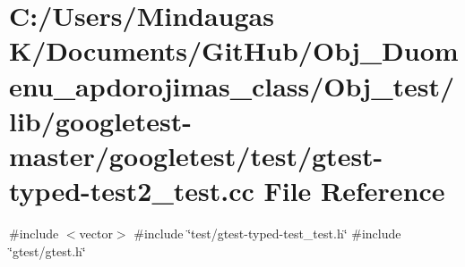 \hypertarget{_obj__test_2lib_2googletest-master_2googletest_2test_2gtest-typed-test2__test_8cc}{}\section{C\+:/\+Users/\+Mindaugas K/\+Documents/\+Git\+Hub/\+Obj\+\_\+\+Duomenu\+\_\+apdorojimas\+\_\+class/\+Obj\+\_\+test/lib/googletest-\/master/googletest/test/gtest-\/typed-\/test2\+\_\+test.cc File Reference}
\label{_obj__test_2lib_2googletest-master_2googletest_2test_2gtest-typed-test2__test_8cc}
{\ttfamily \#include $<$vector$>$}\newline
{\ttfamily \#include \char`\"{}test/gtest-\/typed-\/test\+\_\+test.\+h\char`\"{}}\newline
{\ttfamily \#include \char`\"{}gtest/gtest.\+h\char`\"{}}\newline

